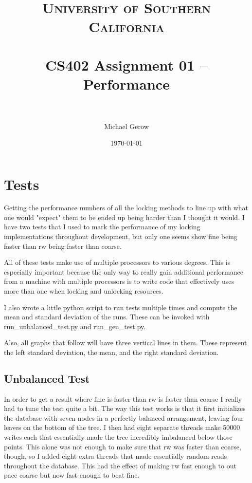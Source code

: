\documentclass[paper=a4, fontsize=11pt]{scrartcl} %
\title{	
\normalfont \normalsize 
\textsc{University of Southern California} \\ [25pt] %
\horrule{0.5pt} \\[0.4cm] %
\huge CS402 Assignment 01 -- Performance \\ %
\horrule{2pt} \\[0.5cm] %
}
\author{Michael Gerow} %
\date{\normalsize\today} %
\numberwithin{equation}{section} %
\numberwithin{figure}{section} %
\numberwithin{table}{section} %
\begin{document}
\maketitle %


\section{Tests}
Getting the performance numbers of all the locking methods to line up with what one would "expect" them to be ended up being harder than I thought it would. I have two tests that I used to mark the performance of my locking implementations throughout development, but only one seems show fine being faster than rw being faster than coarse.

All of these tests make use of multiple processors to various degrees.  This is especially important because the only way to really gain additional performance from a machine with multiple processors is to write code that effectively uses more than one when locking and unlocking resources.

I also wrote a little python script to run tests multiple times and compute the mean and standard deviation of the runs.  These can be invoked with run\_unbalanced\_test.py and run\_gen\_test.py.

Also, all graphs that follow will have three vertical lines in them.  These represent the left standard deviation, the mean, and the right standard deviation.

\subsection{Unbalanced Test}
In order to get a result where fine is faster than rw is faster than coarse I really had to tune the test quite a bit. The way this test works is that it first initializes the database with seven nodes in a perfectly balanced arrangement, leaving four leaves on the bottom of the tree.  I then had eight separate threads make 50000 writes each that essentially made the tree incredibly imbalanced below those points. This alone was not enough to make sure that rw was faster than coarse, though, so I added eight extra threads that made essentially random reads throughout the database.  This had the effect of making rw fast enough to out pace coarse but now fast enough to beat fine.
\end{document}
